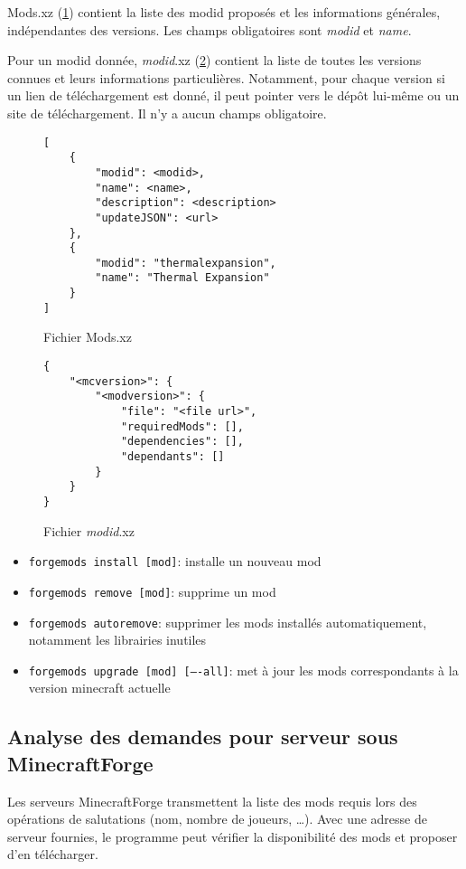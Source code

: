 \documentclass{article}
\begin{document}
Mods.xz (\ref{figure:mods.xz}) contient la liste des modid proposés et les informations générales, indépendantes des versions.
Les champs obligatoires sont \textit{modid} et \textit{name}.

Pour un modid donnée, \textit{modid}.xz (\ref{figure:modid.xz}) contient la liste de toutes les versions connues et leurs informations particulières.
Notamment, pour chaque version si un lien de téléchargement est donné, il peut pointer vers le dépôt lui-même ou un site de téléchargement.
Il n'y a aucun champs obligatoire.

\begin{figure}
\centering
\begin{verbatim}
[
    {
        "modid": <modid>,
        "name": <name>,
        "description": <description>
        "updateJSON": <url>
    },
    {
        "modid": "thermalexpansion",
        "name": "Thermal Expansion"
    }
]
\end{verbatim}
\caption{Fichier Mods.xz}
\label{figure:mods.xz}
\end{figure}

\begin{figure}
\begin{verbatim}
{
    "<mcversion>": {
        "<modversion>": {
            "file": "<file url>",
            "requiredMods": [],
            "dependencies": [],
            "dependants": []
        }
    }
}
\end{verbatim}
\caption{Fichier \textit{modid}.xz}
\label{figure:modid.xz}
\end{figure}

\medskip\noindent
\begin{itemize}
\item \texttt{forgemods install [mod]}: installe un nouveau mod
\item \texttt{forgemods remove [mod]}: supprime un mod
\item \texttt{forgemods autoremove}: supprimer les mods installés automatiquement, notamment les librairies inutiles
\item \texttt{forgemods upgrade [mod] [----all]}: met à jour les mods correspondants à la version minecraft actuelle
\end{itemize}


\subsection{Analyse des demandes pour serveur sous MinecraftForge}
Les serveurs MinecraftForge transmettent la liste des mods requis lors des opérations de salutations (nom, nombre de joueurs, \dots).
Avec une adresse de serveur fournies, le programme peut vérifier la disponibilité des mods et proposer d'en télécharger.
\end{document}
